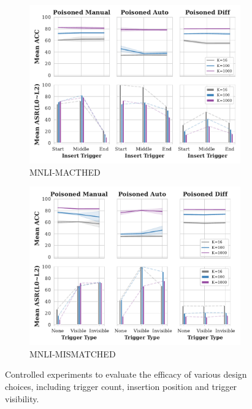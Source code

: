 \begin{figure}[!ht]
\begin{subfigure}{.33\textwidth}
  \includegraphics[width=\linewidth]{figures/evaluation_media/MNLI-MATCHED_insert_pos_impacts.pdf}
  \caption{MNLI-MACTHED}
  \label{fig:mnli_matched_insert_pos_impacts}
\end{subfigure}%
\begin{subfigure}{.33\textwidth}
  \centering
  \includegraphics[width=\linewidth]{figures/evaluation_media/MNLI-MISMATCHED_trigger_type_impacts.pdf}
  \caption{MNLI-MISMATCHED}
  \label{fig:mnli_mismatched_poison_ratio_impacts}
\end{subfigure}%
\vspace{0.5em}
\caption{Controlled experiments to evaluate the efficacy of various design choices, including trigger count, insertion position and trigger visibility.}
\label{fig:eval_different_backdoor}
\end{figure}

